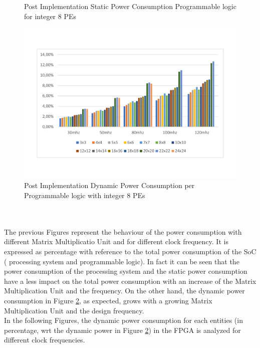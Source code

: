 \begin{itemize}
\begin{figure}[!htbp]
\caption{Post Implementation Static Power Consumption Programmable logic for integer 8 PEs }
\label{fig:staticpowint8}
\end{figure}
\begin{figure}[!htbp]
\centering
\captionsetup{justification=centering}
\includegraphics[scale=0.45,angle=0]{./figure/graphs/power_pldyn_int8_freq.pdf}
\caption{Post Implementation Dynamic Power Consumption per Programmable logic with integer 8 PEs}
\label{fig:dynpowint8}
\end{figure}\\\\
The previous Figures represent the behaviour of the power consumption with different Matrix Multiplicatio Unit and for different clock frequency. It is expressed as percentage with reference to the total power consumption of the SoC ( processing system and programmable logic). In fact it can be seen that the power consumption of the processing system and the static power consumption have a less impact on the total power consumption with an increase of the Matrix Multiplication Unit and the frequency. On the other hand, the dynamic power consumption in Figure \ref{fig:dynpowint8}, as expected, grows with a growing Matrix Multiplication Unit and the design frequency.\\
In the following Figures, the dynamic power consumption for each entities (in percentage, wrt the dynamic power in Figure \ref{fig:dynpowint8}) in the FPGA is analyzed for different clock frequencies.\\
\begin{figure}[!htbp]
\centering
\captionsetup{justification=centering}

\end{figure}
\end{itemize}
